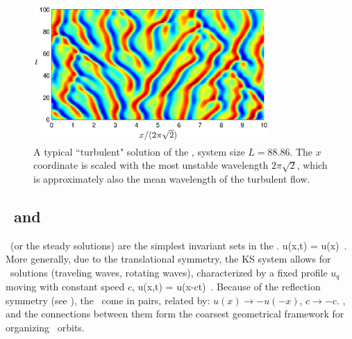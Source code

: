 \begin{figure}[t] \label{f:ks_largeL}
\begin{center}
\includegraphics[width=0.8\textwidth]{figs/ks_largeL.eps}
\end{center}
\caption{
A typical ``turbulent" solution of the \KSe, system size
$L=88.86$.  The $x$
coordinate is scaled with the most unstable wavelength
$2\pi\sqrt{2}$, 
which is approximately also the mean wavelength of the turbulent flow. 
     }
\end{figure}


\subsection{\Eqva\ and \reqva} %
\label{sec:stks}


\Eqva\  (or the steady solutions)
are the simplest invariant sets in
the \statesp. 
\beq
 u(x,t) = u(x) %
\,.
More generally, due to the translational symmetry,
the KS system allows for \reqv\ solutions
(traveling waves, rotating waves),
characterized by a fixed profile $u_q$
moving with constant speed $c$, {\ie}
\beq
 u(x,t) =  u(x-ct) %
\,.
Because of the reflection symmetry (see ),
the \reqva\ come in pairs,
related by: $u(x) \to -u(-x)$, $c \to -c$.
\Eqva,  and
the connections between them form the
coarsest geometrical framework for organizing
\statesp\ orbits. %


